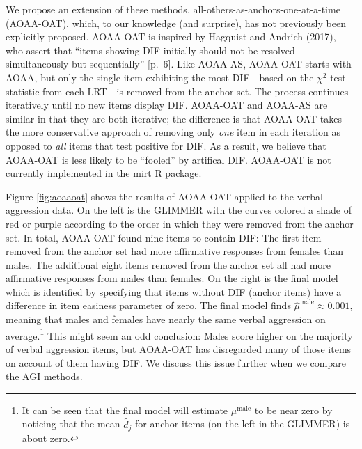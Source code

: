 \documentclass[
  english,
  man,floatsintext]{apa6}
\begin{document}
We propose an extension of these methods, all-others-as-anchors-one-at-a-time (AOAA-OAT), which, to our knowledge (and surprise), has not previously been explicitly proposed. AOAA-OAT is inspired by Hagquist and Andrich (2017), who assert that ``items showing DIF initially should not be resolved simultaneously but sequentially'' {[}p.~6{]}. Like AOAA-AS, AOAA-OAT starts with AOAA, but only the single item exhibiting the most DIF---based on the \(\chi^2\) test statistic from each LRT---is removed from the anchor set. The process continues iteratively until no new items display DIF. AOAA-OAT and AOAA-AS are similar in that they are both iterative; the difference is that AOAA-OAT takes the more conservative approach of removing only \emph{one} item in each iteration as opposed to \emph{all} items that test positive for DIF. As a result, we believe that AOAA-OAT is less likely to be ``fooled'' by artifical DIF. AOAA-OAT is not currently implemented in the mirt R package.

Figure \ref{fig:aoaaoat} shows the results of AOAA-OAT applied to the verbal aggression data. On the left is the GLIMMER with the curves colored a shade of red or purple according to the order in which they were removed from the anchor set. In total, AOAA-OAT found nine items to contain DIF: The first item removed from the anchor set had more affirmative responses from females than males. The additional eight items removed from the anchor set all had more affirmative responses from males than females. On the right is the final model which is identified by specifying that items without DIF (anchor items) have a difference in item easiness parameter of zero. The final model finds \(\hat \mu^\text{male} \approx 0.001\), meaning that males and females have nearly the same verbal aggression on average.\footnote{It can be seen that the final model will estimate \(\mu^\text{male}\) to be near zero by noticing that the mean \(\tilde {d_j}\) for anchor items (on the left in the GLIMMER) is about zero.} This might seem an odd conclusion: Males score higher on the majority of verbal aggression items, but AOAA-OAT has disregarded many of those items on account of them having DIF. We discuss this issue further when we compare the AGI methods.
\end{document}
